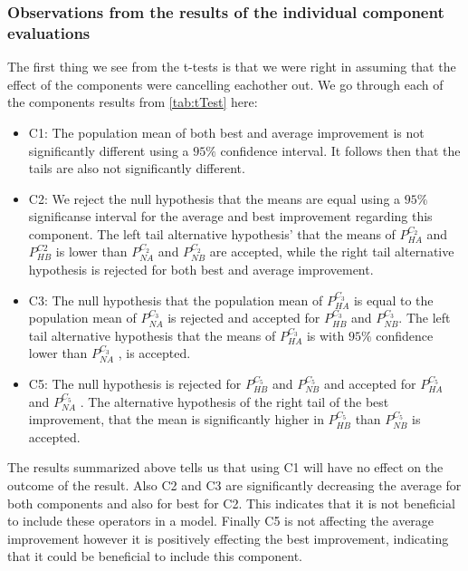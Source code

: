 \documentclass[../main.tex]{subfiles}
\begin{document}
\subsubsection{Observations from the results of the individual component evaluations}
The first thing we see from the t-tests is that we were right in assuming that the effect of the components were cancelling eachother out. 
We go through each of the components results from \cref{tab:tTest} here:
\begin{itemize}
    \item C1: The population mean of both best and average improvement is not significantly different using a $95\%$ confidence interval. It follows then that the tails are also not significantly different.
    \item C2: We reject the null hypothesis that the means are equal using a $95\%$ significanse interval for the average and best improvement regarding this component. 
        The left tail alternative hypothesis' that the means of $P^{C_2}_{HA}$ and $P^{C2}_{HB}$ is lower than $P^{C_2}_{NA}$ and $P^{C_2}_{NB}$ are accepted, while the right tail alternative hypothesis is rejected for both best and average improvement.
    \item C3: The null hypothesis that the population mean of $P^{C_3}_{HA}$ is equal to the population mean of $P^{C_3}_{NA}$ is rejected and accepted for $P^{C_3}_{HB}$ and $P^{C_3}_{NB}$. The left tail alternative hypothesis that the means of $P^{C_3}_{HA}$ is with $95\%$ confidence lower than $P^{C_3}_{NA}$ , is accepted.
    \item C5: The null hypothesis is rejected for  $P^{C_5}_{HB}$ and  $P^{C_5}_{NB}$ and accepted for $P^{C_5}_{HA}$ and $P^{C_5}_{NA}$ . The alternative hypothesis of the right tail of the best improvement, that the mean is significantly higher in $P^{C_5}_{HB}$ than  $P^{C_5}_{NB}$ is accepted.
\end{itemize}

The results summarized above tells us that using C1 will have no effect on the outcome of the result. 
Also C2 and C3 are significantly decreasing the average for both components and also for best for C2. 
This indicates that it is not beneficial to include these operators in a model.
Finally C5 is not affecting the average improvement however it is positively effecting the best improvement, indicating that it could be beneficial to include this component.
\end{document}
